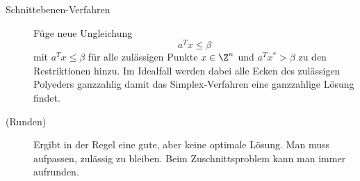 \begin{beispiel}[Zuschnittsoptimierung]
\begin{enumerate}
\begin{itemize}
\begin{enumerate}[label = \arabic*. Fall:]
\begin{description}
            \item [Schnittebenen-Verfahren]
              Füge neue Ungleichung
              \begin{equation*}
                a^{T} x \leq \beta
              \end{equation*}
              mit $a^{T} x \leq \beta$ für alle zulässigen Punkte $x \in \Z^n$ und $a^{T} x^* > \beta $ zu den Restriktionen hinzu.
              Im Idealfall werden dabei alle Ecken des zulässigen Polyeders ganzzahlig damit das Simplex-Verfahren eine ganzzahlige Lösung findet.
            \item [(Runden)] Ergibt in der Regel eine gute, aber keine optimale Lösung. Man muss aufpassen, zulässig zu bleiben. Beim Zuschnittsproblem kann man immer aufrunden.
          \end{description}
			\end{enumerate}
		\end{itemize}
\end{enumerate}
\end{beispiel}

